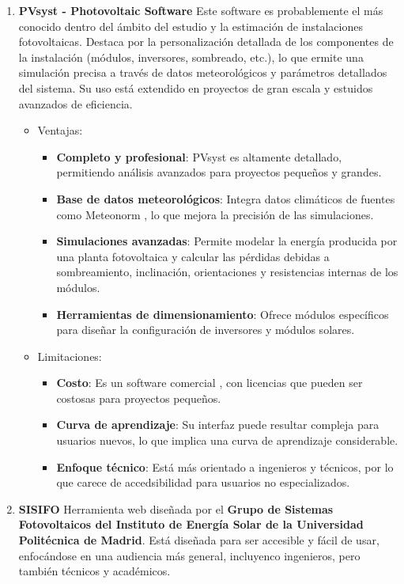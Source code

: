 \begin{enumerate}
\item \textbf{PVsyst - Photovoltaic Software} \cite{pvsyst}
Este software es probablemente el más conocido dentro del ámbito del estudio y la estimación de instalaciones fotovoltaicas. Destaca por la personalización detallada de los componentes de la instalación (módulos, inversores, sombreado, etc.), lo que ermite una simulación precisa a través de datos meteorológicos y parámetros detallados del sistema. Su uso está extendido en proyectos de gran escala y estuidos avanzados de eficiencia.
\begin{itemize}
\item Ventajas:
\begin{itemize}
\item \textbf{Completo y profesional}: PVsyst es altamente detallado, permitiendo análisis avanzados para proyectos pequeños y grandes.
\item \textbf{Base de datos meteorológicos}: Integra datos climáticos de fuentes como Meteonorm \cite{jan20}, lo que mejora la precisión de las simulaciones.
\item \textbf{Simulaciones avanzadas}: Permite modelar la energía producida por una planta fotovoltaica y calcular las pérdidas debidas a sombreamiento, inclinación, orientaciones y resistencias internas de los módulos.
\item \textbf{Herramientas de dimensionamiento}: Ofrece módulos específicos para diseñar la configuración de inversores y módulos solares.
\end{itemize}
\item Limitaciones:
\begin{itemize}
\item \textbf{Costo}: Es un software comercial , con licencias que pueden ser costosas para proyectos pequeños.
\item \textbf{Curva de aprendizaje}: Su interfaz puede resultar compleja para usuarios nuevos, lo que implica una curva de aprendizaje considerable.
\item \textbf{Enfoque técnico}: Está más orientado a ingenieros y técnicos, por lo que carece de accedsibilidad para usuarios no especializados.
\end{itemize}
\end{itemize}
\item \textbf{SISIFO} \cite{sisifo}
Herramienta web diseñada por el \textbf{Grupo de Sistemas Fotovoltaicos del Instituto de Energía Solar de la Universidad Politécnica de Madrid}. Está diseñada para ser accesible y fácil de usar, enfocándose en una audiencia más general, incluyenco ingenieros, pero también técnicos y académicos.

\end{enumerate}
